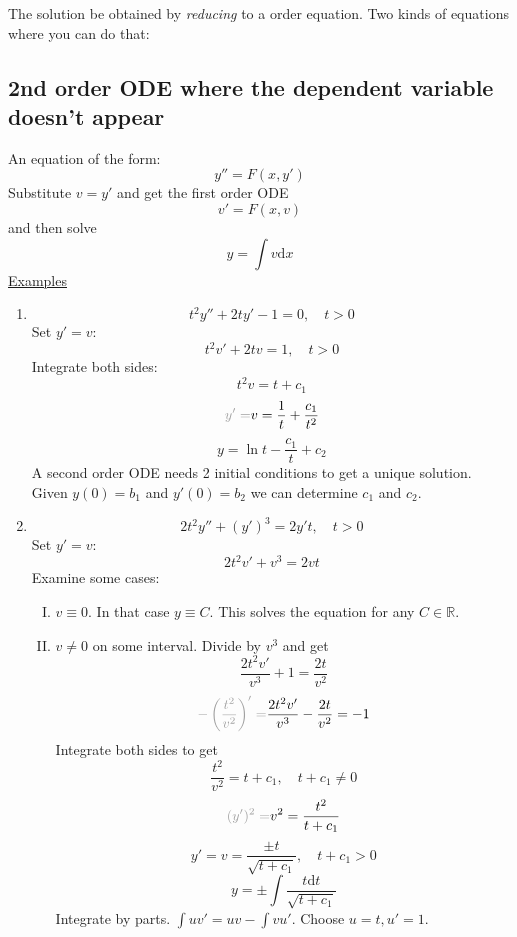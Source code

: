 \documentclass{article}
\newcommand{\mathd}{\mathrm{d}}
\newcommand{\tmem}[1]{{\em #1\/}}
\newcommand{\tmtextbf}[1]{\text{{\bfseries{#1}}}}
\newenvironment{enumeratenumeric}{\begin{enumerate}[1.] }{\end{enumerate}}
\newenvironment{enumerateromancap}{\begin{enumerate}[I.] }{\end{enumerate}}
\begin{document}
The solution be obtained by {\tmem{reducing}} to a \tmtextbf{first} order
equation. Two kinds of equations where you can do that:

\subsection{2nd order ODE where the dependent variable doesn't appear}

An equation of the form:
\[ y'' = F (x, y') \]
Substitute $v = y'$ and get the first order ODE
\[ v' = F (x, v) \]
and then solve
\[ y = \int v \mathd x \]
{\underline{Examples}}
\begin{enumeratenumeric}
  \item
  \[ t^2 y'' + 2 ty' - 1 = 0, \quad t > 0 \]
  Set $y' = v$:
  \[ t^2 v' + 2 tv = 1, \quad t > 0 \]
  Integrate both sides:
  \[ t^2 v = t + c_1 \]
  \[ {\color[HTML]{A0A0A0}y' =} v = \frac{1}{t} + \frac{c_1}{t^2} \]
  \[ y = \ln t - \frac{c_1}{t} + c_2 \]
  A second order ODE needs 2 initial conditions to get a unique solution.
  Given $y (0) = b_1$ and $y' (0) = b_2$ we can determine $c_1$ and $c_2$.
  
  \item
  \[ 2 t^2 y'' + (y')^3 = 2 y' t, \quad t > 0 \]
  Set $y' = v$:
  \[ 2 t^2 v' + v^3 = 2 vt \]
  Examine some cases:
  \begin{enumerateromancap}
    \item $v \equiv 0$. In that case $y \equiv C$. This solves the equation
    for any $C \in \mathbb{R}$.
    
    \item $v \neq 0$ on some interval. Divide by $v^3$ and get
    \[ \frac{2 t^2 v'}{v^3} + 1 = \frac{2 t}{v^2} \]
    \[ {\color[HTML]{A0A0A0}- \left( \frac{t^2}{v^2} \right)' =} \frac{2 t^2
       v'}{v^3} - \frac{2 t}{v^2} = - 1 \]
    Integrate both sides to get
    \[ \frac{t^2}{v^2} = t + c_1, \quad t + c_1 \neq 0 \]
    \[ {\color[HTML]{A0A0A0}(y')^2 =} v^2 = \frac{t^2}{t + c_1} \]
    \[ y' = v = \frac{\pm t}{\sqrt{t + c_1}}, \quad t + c_1 > 0 \]
    \[ y = \pm \int \frac{t \mathd t}{\sqrt{t + c_1}} \]
    Integrate by parts. $\int uv' = uv - \int vu'$. Choose $u = t, u' = 1$.
    

\end{enumerateromancap}
\end{enumeratenumeric}
\end{document}
